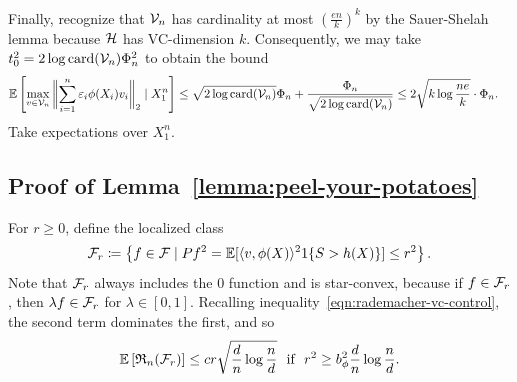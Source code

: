 \documentclass[11pt]{article}
\newcommand{\radphi}{b_{\phi}}
\newcommand{\scorefunc}{s}
\newcommand{\scoreval}{\scorefunc}
\newcommand{\scorerv}{S}
\begin{document}
Finally, recognize that $\mathcal{V}_n$ has cardinality at most $(\frac{e
  n}{k})^{k}$ by the Sauer-Shelah lemma because $\mathcal{H}$ has VC-dimension
$k$.
%
Consequently, we may take $t_0^2 = 2 \log \mathop{\rm card}(\mathcal{V}_n) \Phi_n^2$ to
obtain the bound
\begin{align*}
  \mathbb{E}\left[\max_{v \in \mathcal{V}_n} \bigg\|{\sum_{i = 1}^n
      \varepsilon_i \phi(X_i) v_i}\bigg\|_2
    \mid X_1^n \right]
  & \le \sqrt{2 \log \mathop{\rm card}(\mathcal{V}_n)} \Phi_n
  + \frac{\Phi_n}{\sqrt{2 \log \mathop{\rm card}(\mathcal{V}_n)}}
  \le 2 \sqrt{k \log \frac{n e}{k}} \cdot \Phi_n.
\end{align*}
Take expectations over $X_1^n$.

\subsection{Proof of Lemma~\ref{lemma:peel-your-potatoes}}
\label{sec:proof-peel-your-potatoes}

For $r \ge 0$, define the localized class
\begin{equation*}
  \mc{F}_r \defeq
  \left\{f \in \mc{F}
  \mid Pf^2 = \E[\<v, \phi(X)\>^2 \indic{\scorerv
      > h(X)}] \le r^2 \right\}.
\end{equation*}
Note that $\mathcal{F}_r$ always includes the 0 function and is star-convex,
because if $f \in \mathcal{F}_r$, then $\lambda f \in \mathcal{F}_r$ for $\lambda \in
[0, 1]$.
%
Recalling inequality~\eqref{eqn:rademacher-vc-control},
the second term dominates the first, and so
\begin{equation*}
  \E\left[\rademacher_n(\mc{F}_r)\right]
  \le c r \sqrt{\frac{d}{n} \log \frac{n}{d}}
  ~~ \mbox{if}~~
  r^2 \ge \radphi^2 \frac{d}{n} \log \frac{n}{d}.
\end{equation*}
\end{document}
